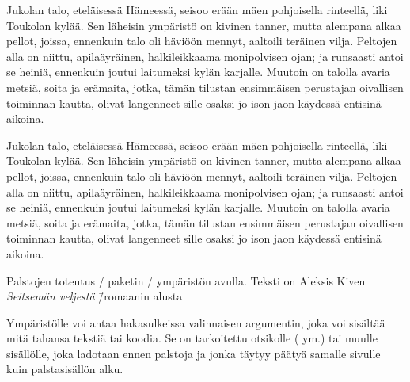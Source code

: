 \begin{esimerkki*}

\begin{koodilohko}
\begin{multicols}{3}  %
  \noindent Jukolan talo, eteläisessä Hämeessä, seisoo erään mäen
  pohjoisella rinteellä, liki Toukolan kylää. Sen läheisin ympäristö on
  kivinen tanner, mutta alempana alkaa pellot, joissa, ennenkuin talo
  oli häviöön mennyt, aaltoili teräinen vilja. Peltojen alla on niittu,
  apilaäyräinen, halkileikkaama monipolvisen ojan; ja runsaasti antoi se
  heiniä, ennenkuin joutui laitumeksi kylän karjalle. Muutoin on talolla
  avaria metsiä, soita ja erämaita, jotka, tämän tilustan ensimmäisen
  perustajan oivallisen toiminnan kautta, olivat langenneet sille osaksi
  jo ison jaon käydessä entisinä aikoina.
\end{multicols}
\end{koodilohko}
  \begin{tulos}
    \footnotesize
    \setlength{\columnsep}{1em}
    \setlength{\multicolsep}{0bp}
    \begin{multicols}{3}
      \noindent Jukolan talo, eteläisessä Hämeessä, seisoo erään mäen
      pohjoisella rinteellä, liki Toukolan kylää. Sen läheisin ympäristö
      on kivinen tanner, mutta alempana alkaa pellot, joissa, ennenkuin
      talo oli häviöön mennyt, aaltoili teräinen vilja. Peltojen alla on
      niittu, api\-la\-äyräi\-nen, halkileikkaama monipolvisen ojan; ja
      runsaasti antoi se heiniä, ennenkuin joutui laitumeksi kylän
      karjalle. Muutoin on talolla avaria metsiä, soita ja erämaita,
      jotka, tämän tilustan ensimmäisen perustajan oivallisen toiminnan
      kautta, olivat langenneet sille osaksi jo ison jaon käydessä
      entisinä aikoina.
    \end{multicols}
  \end{tulos}

  \caption{Palstojen toteutus \-/ paketin
    \-/ ympäristön avulla. Teksti on Aleksis Kiven
    \emph{Seitsemän veljestä} \=/romaanin alusta}
  \label{esim/multicols}
\end{esimerkki*}

Ympäristölle voi antaa hakasulkeissa valinnaisen argumentin, joka voi
sisältää mitä tahansa tekstiä tai koodia. Se on tarkoitettu otsikolle
( ym.) tai muulle sisällölle, joka ladotaan ennen
palstoja ja jonka täytyy päätyä samalle sivulle kuin palstasisällön
alku.

